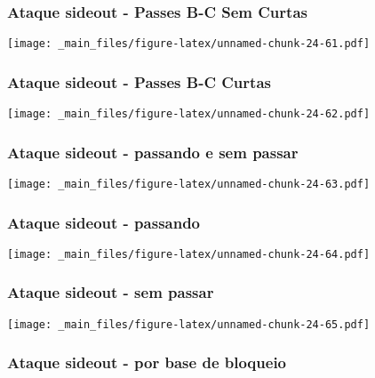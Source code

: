 \documentclass[
]{book}
\begin{document}
\subsubsection*{Ataque sideout - Passes B-C Sem Curtas}\label{ataque-sideout---passes-b-c-sem-curtas-3}

\texttt{[image: \_main\_files/figure-latex/unnamed-chunk-24-61.pdf]}

\subsubsection*{Ataque sideout - Passes B-C Curtas}\label{ataque-sideout---passes-b-c-curtas-3}

\texttt{[image: \_main\_files/figure-latex/unnamed-chunk-24-62.pdf]}

\subsubsection*{Ataque sideout - passando e sem passar}\label{ataque-sideout---passando-e-sem-passar-3}

\texttt{[image: \_main\_files/figure-latex/unnamed-chunk-24-63.pdf]}

\subsubsection*{Ataque sideout - passando}\label{ataque-sideout---passando-3}

\texttt{[image: \_main\_files/figure-latex/unnamed-chunk-24-64.pdf]}

\subsubsection*{Ataque sideout - sem passar}\label{ataque-sideout---sem-passar-3}

\texttt{[image: \_main\_files/figure-latex/unnamed-chunk-24-65.pdf]}

\subsubsection*{Ataque sideout - por base de bloqueio}\label{ataque-sideout---por-base-de-bloqueio-3}
\end{document}
